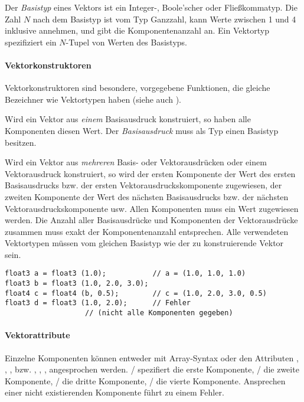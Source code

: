 

Der \emph{Basistyp} eines Vektors ist ein Integer-, Boole'scher oder Fließkommatyp.
Die Zahl $N$ nach dem Basistyp ist vom Typ
Ganzzahl, kann Werte zwischen 1 und 4 inklusive annehmen, und gibt die Komponentenanzahl an.
 Ein Vektortyp spezifiziert ein $N$-Tupel von Werten
des Basistyps.

\paragraph{Vektorkonstruktoren}\label{Vektorkonstruktoren}

Vektorkonstruktoren sind besondere, vorgegebene Funktionen, die gleiche Bezeichner wie Vektortypen haben
(siehe auch ).

Wird ein Vektor aus \emph{einem} Basisausdruck konstruiert, so haben alle Komponenten diesen Wert.
Der \emph{Basisausdruck} muss als Typ einen Basistyp besitzen.

Wird ein Vektor aus \emph{mehreren} Basis- oder Vektorausdrücken oder einem Vektorausdruck konstruiert,
so wird der ersten Komponente der Wert des ersten Basisausdrucks bzw. der ersten Vektorausdruckskomponente zugewiesen,
der zweiten Komponente der Wert des nächsten Basisausdrucks bzw. der nächsten Vektorausdruckskomponente usw.
Allen Komponenten muss ein Wert zugewiesen werden. Die Anzahl aller Basisausdrücke und Komponenten der Vektorausdrücke
zusammen muss exakt der Komponentenanzahl entsprechen.
Alle verwendeten Vektortypen müssen vom gleichen Basistyp wie der zu konstruierende Vektor sein.

\begin{lstlisting}[basicstyle=\ttfamily\small,lineskip=-11pt]
float3 a = float3 (1.0);           // a = (1.0, 1.0, 1.0)
float3 b = float3 (1.0, 2.0, 3.0);
float4 c = float4 (b, 0.5);        // c = (1.0, 2.0, 3.0, 0.5)
float3 d = float3 (1.0, 2.0);      // Fehler
				   // (nicht alle Komponenten gegeben)
\end{lstlisting}




\paragraph{Vektorattribute}\label{Vektorattribute}
Einzelne Komponenten können entweder mit Array-Syntax oder den Attributen ,
, ,  bzw. , , ,  angesprochen
werden. / spezifiert die erste Komponente,
/ die zweite Komponente, / die dritte Komponente,
/ die vierte Komponente. Ansprechen einer nicht existierenden Komponente
führt zu einem Fehler.

